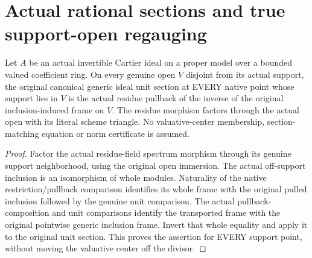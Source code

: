 \section{Actual rational sections and true support-open regauging}

\begin{lemma}
\label{lem:intrinsic-numerical-cartier-generic-unit-support-section}
\leanok
{}
Let $A$ be an actual invertible Cartier ideal on a proper model over a bounded
valued coefficient ring. On every genuine open $V$ disjoint from its actual
support, the original canonical generic ideal unit section at EVERY native
point whose support lies in $V$ is the actual residue pullback of the inverse
of the original inclusion-induced frame on $V$. The residue morphism factors
through the actual open with its literal scheme triangle. No valuative-center
membership, section-matching equation or norm certificate is assumed.
\end{lemma}
\begin{proof}
Factor the actual residue-field spectrum morphism through its genuine support
neighborhood, using the original open immersion. The actual off-support
inclusion is an isomorphism of whole modules. Naturality of the native
restriction/pullback comparison identifies its whole frame with the original
pulled inclusion followed by the genuine unit comparison. The actual
pullback-composition and unit comparisons identify the transported frame with
the original pointwise generic inclusion frame. Invert that whole equality
and apply it to the original unit section. This proves the assertion for
EVERY support point, without moving the valuative center off the divisor.
\end{proof}

